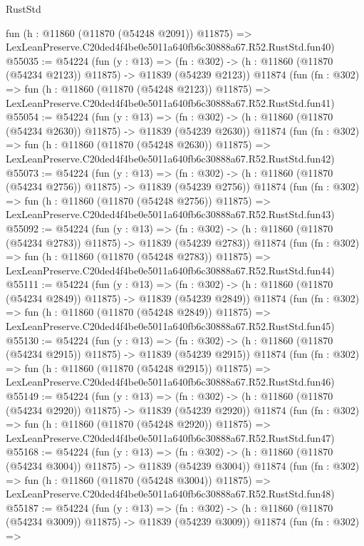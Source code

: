\begin{lexlean}{RustStd}
\begin{coremodule}
    fun (h : @11860 (@11870 (@54248 @2091)) @11875) =>
    LexLeanPreserve.C20ded4f4be0e5011a640fb6c30888a67.R52.RustStd.fun40)
@55035 := @54224
    (fun (y : @13) =>
    (fn : @302) -> (h : @11860 (@11870 (@54234 @2123)) @11875) -> @11839 (@54239 @2123))
    @11874
    (fun (fn : @302) =>
    fun (h : @11860 (@11870 (@54248 @2123)) @11875) =>
    LexLeanPreserve.C20ded4f4be0e5011a640fb6c30888a67.R52.RustStd.fun41)
@55054 := @54224
    (fun (y : @13) =>
    (fn : @302) -> (h : @11860 (@11870 (@54234 @2630)) @11875) -> @11839 (@54239 @2630))
    @11874
    (fun (fn : @302) =>
    fun (h : @11860 (@11870 (@54248 @2630)) @11875) =>
    LexLeanPreserve.C20ded4f4be0e5011a640fb6c30888a67.R52.RustStd.fun42)
@55073 := @54224
    (fun (y : @13) =>
    (fn : @302) -> (h : @11860 (@11870 (@54234 @2756)) @11875) -> @11839 (@54239 @2756))
    @11874
    (fun (fn : @302) =>
    fun (h : @11860 (@11870 (@54248 @2756)) @11875) =>
    LexLeanPreserve.C20ded4f4be0e5011a640fb6c30888a67.R52.RustStd.fun43)
@55092 := @54224
    (fun (y : @13) =>
    (fn : @302) -> (h : @11860 (@11870 (@54234 @2783)) @11875) -> @11839 (@54239 @2783))
    @11874
    (fun (fn : @302) =>
    fun (h : @11860 (@11870 (@54248 @2783)) @11875) =>
    LexLeanPreserve.C20ded4f4be0e5011a640fb6c30888a67.R52.RustStd.fun44)
@55111 := @54224
    (fun (y : @13) =>
    (fn : @302) -> (h : @11860 (@11870 (@54234 @2849)) @11875) -> @11839 (@54239 @2849))
    @11874
    (fun (fn : @302) =>
    fun (h : @11860 (@11870 (@54248 @2849)) @11875) =>
    LexLeanPreserve.C20ded4f4be0e5011a640fb6c30888a67.R52.RustStd.fun45)
@55130 := @54224
    (fun (y : @13) =>
    (fn : @302) -> (h : @11860 (@11870 (@54234 @2915)) @11875) -> @11839 (@54239 @2915))
    @11874
    (fun (fn : @302) =>
    fun (h : @11860 (@11870 (@54248 @2915)) @11875) =>
    LexLeanPreserve.C20ded4f4be0e5011a640fb6c30888a67.R52.RustStd.fun46)
@55149 := @54224
    (fun (y : @13) =>
    (fn : @302) -> (h : @11860 (@11870 (@54234 @2920)) @11875) -> @11839 (@54239 @2920))
    @11874
    (fun (fn : @302) =>
    fun (h : @11860 (@11870 (@54248 @2920)) @11875) =>
    LexLeanPreserve.C20ded4f4be0e5011a640fb6c30888a67.R52.RustStd.fun47)
@55168 := @54224
    (fun (y : @13) =>
    (fn : @302) -> (h : @11860 (@11870 (@54234 @3004)) @11875) -> @11839 (@54239 @3004))
    @11874
    (fun (fn : @302) =>
    fun (h : @11860 (@11870 (@54248 @3004)) @11875) =>
    LexLeanPreserve.C20ded4f4be0e5011a640fb6c30888a67.R52.RustStd.fun48)
@55187 := @54224
    (fun (y : @13) =>
    (fn : @302) -> (h : @11860 (@11870 (@54234 @3009)) @11875) -> @11839 (@54239 @3009))
    @11874
    (fun (fn : @302) =>

\end{coremodule}
\end{lexlean}
